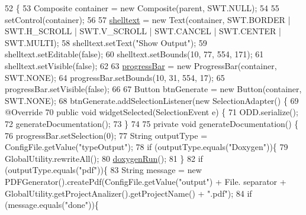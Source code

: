 \begin{DoxyCode}
52                                                 \{
53         Composite container = \textcolor{keyword}{new} Composite(parent, SWT.NULL);
54 
55         setControl(container);
56         
57         \hyperlink{classit_1_1isislab_1_1masonhelperdocumentation_1_1mason_1_1wizards_1_1_q___end_wizard_ab4650e9141ffb45563506bcf2b5daa4e}{shelltext} = \textcolor{keyword}{new} Text(container, SWT.BORDER | SWT.H\_SCROLL | SWT.V\_SCROLL | SWT.CANCEL | 
      SWT.CENTER | SWT.MULTI);
58         shelltext.setText(\textcolor{stringliteral}{"Show Output"});
59         shelltext.setEditable(\textcolor{keyword}{false});
60         shelltext.setBounds(10, 77, 554, 171);
61         shelltext.setVisible(\textcolor{keyword}{false});
62         
63         \hyperlink{classit_1_1isislab_1_1masonhelperdocumentation_1_1mason_1_1wizards_1_1_q___end_wizard_a43d65086e656c40478f720a0a9cac522}{progressBar} = \textcolor{keyword}{new} ProgressBar(container, SWT.NONE);
64         progressBar.setBounds(10, 31, 554, 17);
65         progressBar.setVisible(\textcolor{keyword}{false});
66         
67         Button btnGenerate = \textcolor{keyword}{new} Button(container, SWT.NONE);
68         btnGenerate.addSelectionListener(\textcolor{keyword}{new} SelectionAdapter() \{
69             @Override
70             \textcolor{keyword}{public} \textcolor{keywordtype}{void} widgetSelected(SelectionEvent e) \{
71                 ODD.serialize();
72                 generateDocumentation();
73             \}
74 
75             \textcolor{keyword}{private} \textcolor{keywordtype}{void} generateDocumentation() \{
76                 progressBar.setSelection(0);
77                 String outputType = ConfigFile.getValue(\textcolor{stringliteral}{"typeOutput"});
78                 \textcolor{keywordflow}{if} (outputType.equals(\textcolor{stringliteral}{"Doxygen"}))\{
79                     GlobalUtility.rewriteAll();
80                     \hyperlink{classit_1_1isislab_1_1masonhelperdocumentation_1_1mason_1_1wizards_1_1_q___end_wizard_a5711bf4858bd7e5787743ec96669a19d}{doxygenRun}(); 
81                 \}
82                 \textcolor{keywordflow}{if} (outputType.equals(\textcolor{stringliteral}{"pdf"}))\{
83                     String message = \textcolor{keyword}{new} PDFGenerator().createPdf(ConfigFile.getValue(\textcolor{stringliteral}{"output"}) + File.
      separator + GlobalUtility.getProjectAnalizer().getProjectName() + \textcolor{stringliteral}{".pdf"});
84                     \textcolor{keywordflow}{if} (message.equals(\textcolor{stringliteral}{"done"}))\{

\end{DoxyCode}
